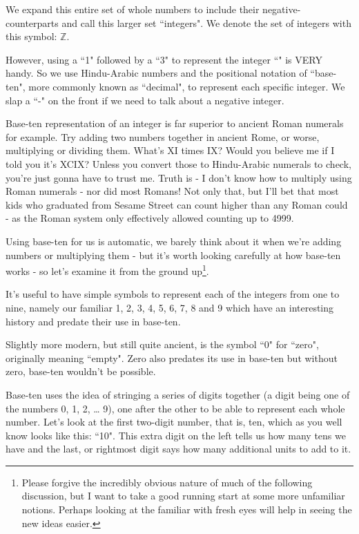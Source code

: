 \documentclass{article}
\begin{document}
We expand this entire set of whole numbers to include their
negative-counterparts and call this larger set ``integers".
We denote the set of integers with this symbol: $\mathbb{Z}$.

However, using a ``1" followed by a ``3" to represent the integer
``\faApple{}\faApple{}\faApple{}\faApple{}\faApple{}\faApple{}\faApple{}\faApple{}\faApple{}\faApple{}\faApple{}\faApple{}\faApple{}"
is VERY handy. So we use Hindu-Arabic numbers and the positional notation of ``base-ten",
more commonly known as ``decimal", to represent each specific integer.
We slap a ``-" on the front if we need to talk about a negative integer.

Base-ten representation of an integer is far superior to ancient Roman numerals for example.
Try adding two numbers together in ancient Rome, or worse,
multiplying or dividing them.
What's XI times IX? Would you believe me if I told
you it's XCIX? Unless you convert those to Hindu-Arabic numerals to check,
you're just gonna have to trust me.
Truth is - I don't know how to multiply using Roman
numerals - nor did most Romans! Not only that,
but I'll bet that most kids who graduated from Sesame Street
can count higher than any Roman could - as the
Roman system only effectively allowed counting up to 4999.

Using base-ten for us is automatic,
we barely think about it when we're adding numbers or multiplying
them - but it's worth looking carefully at how base-ten
works - so let's examine it from the ground up\footnote{Please forgive
the incredibly obvious nature of much
of the following discussion, but I want to take a good running start
at some more unfamiliar notions.
Perhaps looking at the familiar with fresh eyes will help in seeing the new ideas easier.}.

It's useful to have simple symbols to represent each of the integers from one to nine,
namely our familiar 1, 2, 3, 4, 5, 6, 7, 8 and 9
which have an interesting history and predate their use in base-ten.

Slightly more modern, but still quite ancient,
is the symbol ``0" for ``zero", originally meaning ``empty".
Zero also predates its use in base-ten but without zero,
base-ten wouldn't be possible.

Base-ten uses the idea of stringing a series of digits together
(a digit being one of the numbers 0, 1, 2, \dots{} 9),
one after the other to be able to represent each whole number.
Let's look at the first two-digit number, that is, ten,
which as you well know looks like this: ``10".
This extra digit on the left tells us how many tens we have and the last,
or rightmost digit says how many additional units to add to it.
\end{document}
